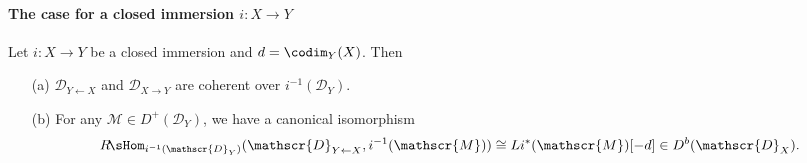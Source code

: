 \paragraph{The case for a closed immersion \texorpdfstring{$i:X\to Y$}{i}}
\begin{proposition}\label{D-module closed immersion direct image relative module dual prop}
Let $i:X\to Y$ be a closed immersion and $d=\codim_Y(X)$. Then
\begin{enumerate}
    \item[(a)] $\mathscr{D}_{Y\leftarrow X}$ and $\mathscr{D}_{X\to Y}$ are coherent over $i^{-1}(\mathscr{D}_Y)$.
    \item[(b)] For any $\mathscr{M}\in D^+(\mathscr{D}_Y)$, we have a canonical isomorphism
    \begin{gather*}
    R\!\sHom_{i^{-1}(\mathscr{D}_Y)}(\mathscr{D}_{Y\leftarrow X},i^{-1}(\mathscr{M}))\cong Li^*(\mathscr{M})[-d]\in D^b(\mathscr{D}_X).
    \end{gather*}
\end{enumerate}
\end{proposition}
